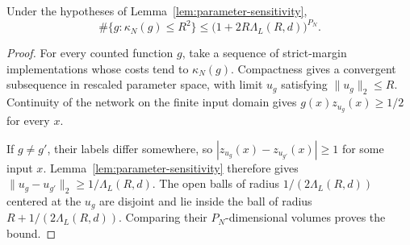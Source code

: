 \begin{proposition}
\label{prop:packing}
Under the hypotheses of Lemma~\ref{lem:parameter-sensitivity},
\[
 \#\{g:\kappa_N(g)\leq R^2\}
 \leq \bigl(1+2R\Lambda_L(R,d)\bigr)^{P_N}.
\]
\end{proposition}

\begin{proof}
For every counted function $g$, take a sequence of strict-margin
implementations whose costs tend to $\kappa_N(g)$.
Compactness gives a convergent subsequence in rescaled parameter space,
with limit $u_g$ satisfying $\|u_g\|_2\leq R$.
Continuity of the network on the finite input domain gives
$g(x)z_{u_g}(x)\geq1/2$ for every $x$.

If $g\ne g'$, their labels differ somewhere, so
$|z_{u_g}(x)-z_{u_{g'}}(x)|\geq1$ for some input $x$.
Lemma~\ref{lem:parameter-sensitivity} therefore gives
$\|u_g-u_{g'}\|_2\geq1/\Lambda_L(R,d)$.
The open balls of radius $1/(2\Lambda_L(R,d))$ centered at the $u_g$
are disjoint and lie inside the ball of radius
$R+1/(2\Lambda_L(R,d))$.
Comparing their $P_N$-dimensional volumes proves the bound.
\end{proof}

